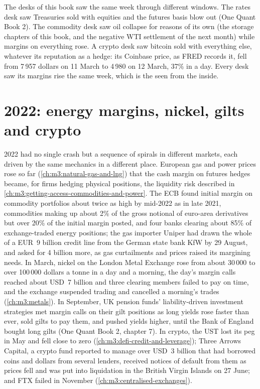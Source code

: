 The desks of this book saw the same week through different windows. The rates desk saw Treasuries sold with equities and the futures basis blow out
(One Quant Book 2). The commodity desk saw oil collapse for reasons of its own (the storage chapters of this book, and the negative WTI settlement of the
next month) while margins on everything rose. A crypto desk saw bitcoin sold with everything else, whatever its reputation as a hedge: its Coinbase price,
as FRED records it, fell from 7\,957 dollars on 11 March to 4\,980 on 12 March, 37\% in a day. Every desk saw its margins rise the same week, which is the  seen from the inside.

\section{2022: energy margins, nickel, gilts and crypto}

2022 had no single crash but a sequence of spirals in different markets, each driven by the same mechanics in a different place. European gas and power prices
rose so far (\cref{ch:m3:natural-gas-and-lng}) that the cash margin on futures hedges became, for firms hedging physical positions, the liquidity risk
described in \cref{ch:m3:getting-access-commodities-and-power}. The ECB found initial margin on commodity portfolios about twice as high by mid-2022 as in
late 2021, commodities making up about 2\% of the gross notional of euro-area derivatives but over 20\% of the initial margin posted, and four banks
clearing about 85\% of exchange-traded energy positions; the gas importer Uniper had drawn the whole of a EUR~9 billion credit line from the German state
bank KfW by 29 August, and asked for 4 billion more, as gas curtailments and prices raised its margining needs.
In March, nickel on the London Metal Exchange rose from about 30\,000 to over 100\,000 dollars a tonne in a day and a morning, the day's margin calls reached
about USD~7 billion and three clearing members failed to pay on time, and the exchange suspended trading and cancelled a morning's trades
(\cref{ch:m3:metals}). In September, UK pension funds' liability-driven investment strategies met margin calls on their gilt positions as long yields rose
faster than ever, sold gilts to pay them, and pushed yields higher, until the Bank of England bought long gilts (One Quant Book 2, chapter 7). In crypto, the
 UST lost its peg in May and fell close to zero (\cref{ch:m3:defi-credit-and-leverage}); Three Arrows Capital, a crypto fund reported to manage over
USD~3 billion that had borrowed coins and dollars from several lenders, received notices of default from them as prices fell and was put into liquidation in
the British Virgin Islands on 27 June; and FTX failed in November
(\cref{ch:m3:centralised-exchanges}).

